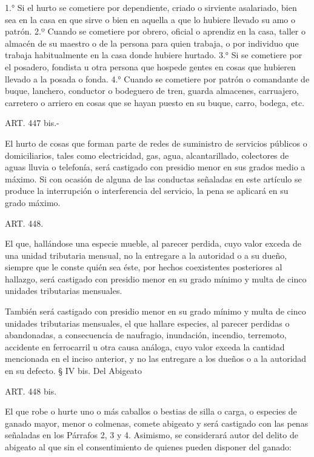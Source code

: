     1.° Si el hurto se cometiere por dependiente, criado o sirviente asalariado, bien sea en la casa en que sirve o bien en aquella a que lo hubiere llevado su amo o patrón.
    2.º Cuando se cometiere por obrero, oficial o aprendiz en la casa, taller o almacén de su maestro o de la persona para quien trabaja, o por individuo que trabaja habitualmente en la casa donde hubiere hurtado.
    3.° Si se cometiere por el posadero, fondista u otra persona que hospede gentes en cosas que hubieren llevado a la posada o fonda.
    4.° Cuando se cometiere por patrón o comandante de buque, lanchero, conductor o bodeguero de tren, guarda almacenes, carruajero, carretero o arriero en cosas que se hayan puesto en su buque, carro, bodega, etc.



    ART. 447 bis.-

    El hurto de cosas que forman parte de redes de suministro de servicios públicos o domiciliarios, tales como electricidad, gas, agua, alcantarillado, colectores de aguas lluvia o telefonía, será castigado con presidio menor en sus grados medio a máximo.
    Si con ocasión de alguna de las conductas señaladas en este artículo se produce la interrupción o interferencia del servicio, la pena se aplicará en su grado máximo.


    ART. 448.

    El que, hallándose una especie mueble, al parecer perdida, cuyo valor exceda de una unidad tributaria mensual, no la entregare a la autoridad o a su dueño, siempre que le conste quién sea éste, por hechos coexistentes posteriores al hallazgo, será castigado con presidio menor en su grado mínimo y multa de cinco unidades tributarias mensuales.

    También será castigado con presidio menor en su grado mínimo y multa de cinco unidades tributarias mensuales, el que hallare especies, al parecer perdidas o abandonadas, a consecuencia de naufragio, inundación, incendio, terremoto, accidente en ferrocarril u otra causa análoga, cuyo valor exceda la cantidad mencionada en el inciso anterior, y no las entregare a los dueños o a la autoridad en su defecto.
    § IV bis. Del Abigeato



    ART. 448 bis.
   
    El que robe o hurte uno o más caballos o bestias de silla o carga, o especies de ganado mayor, menor o colmenas, comete abigeato y será castigado con las penas señaladas en los Párrafos 2, 3 y 4.
    Asimismo, se considerará autor del delito de abigeato al que sin el consentimiento de quienes pueden disponer del ganado:

